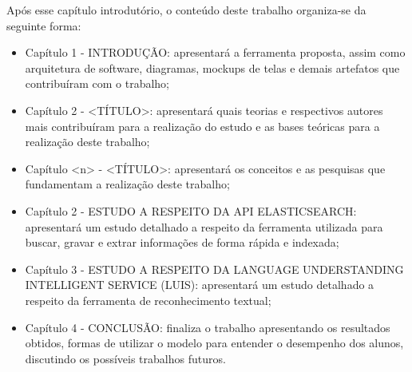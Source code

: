 Após esse capítulo introdutório, o conteúdo deste trabalho organiza-se da seguinte forma:
	\begin{itemize}
		\item{Capítulo 1 - \uppercase{Introdução}: apresentará a ferramenta proposta, assim como arquitetura de software, diagramas, mockups de telas e demais artefatos que contribuíram com o trabalho;}
		\item{Capítulo 2 - \uppercase{<Título>}: apresentará quais teorias e respectivos autores mais contribuíram para a realização do estudo e as bases teóricas para a realização deste trabalho;}
		\item{Capítulo <n> - \uppercase{<Título>}: apresentará os conceitos e as pesquisas que fundamentam a realização deste trabalho;}
		\item{Capítulo 2 - \uppercase{Estudo a respeito da API Elasticsearch}: apresentará um estudo detalhado a respeito da ferramenta utilizada para buscar, gravar e extrar informações de forma rápida e indexada;}
		\item{Capítulo 3 - \uppercase{Estudo a respeito da Language Understanding Intelligent Service (LUIS)}: apresentará um estudo detalhado a respeito da ferramenta de reconhecimento textual;}
		\item{Capítulo 4 - CONCLUSÃO: finaliza o trabalho apresentando os resultados obtidos, formas de utilizar o modelo para entender o desempenho dos alunos, discutindo os possíveis trabalhos futuros.}
	\end{itemize}
